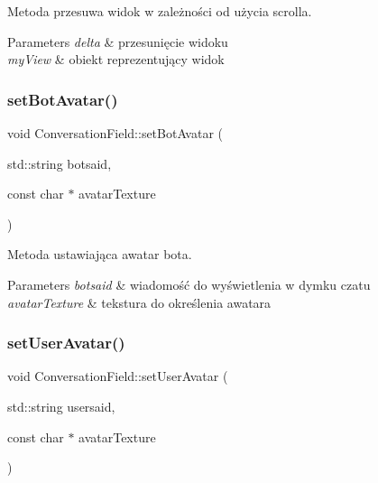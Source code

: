 Metoda przesuwa widok w zależności od użycia scrolla. 


\begin{DoxyParams}{Parameters}
{\em delta} & przesunięcie widoku \\
\hline
{\em my\+View} & obiekt reprezentujący widok \\
\hline
\end{DoxyParams}
\mbox{\label{class_conversation_field_addb47862af1b984d2fad2d03a1b180b6}} 
\subsubsection{\texorpdfstring{setBotAvatar()}{setBotAvatar()}}
{\footnotesize\ttfamily void Conversation\+Field\+::set\+Bot\+Avatar (\begin{DoxyParamCaption}\item[{std\+::string}]{botsaid,  }\item[{const char $\ast$}]{avatar\+Texture }\end{DoxyParamCaption})}



Metoda ustawiająca awatar bota. 


\begin{DoxyParams}{Parameters}
{\em botsaid} & wiadomość do wyświetlenia w dymku czatu \\
\hline
{\em avatar\+Texture} & tekstura do określenia awatara \\
\hline
\end{DoxyParams}
\mbox{\label{class_conversation_field_a292ec090318762b21495ed18f21fb29c}} 
\subsubsection{\texorpdfstring{setUserAvatar()}{setUserAvatar()}}
{\footnotesize\ttfamily void Conversation\+Field\+::set\+User\+Avatar (\begin{DoxyParamCaption}\item[{std\+::string}]{usersaid,  }\item[{const char $\ast$}]{avatar\+Texture }\end{DoxyParamCaption})}



